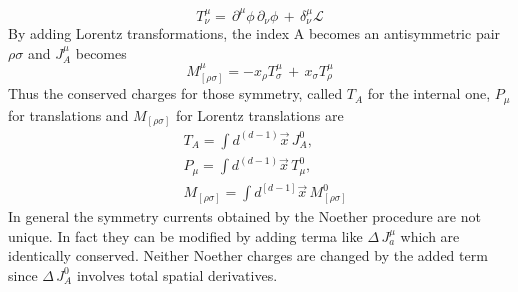 \documentclass[a4paper,10pt]{article}
\begin{document}
\begin{equation}
 T^\mu_\nu=\, \partial^\mu\phi\,\partial_\nu\phi\,+\,\delta^\mu_\nu\mathcal{L}
\end{equation}
By adding Lorentz transformations, the index A becomes an antisymmetric pair $\rho\sigma$
and $J^\mu_A$ becomes
\begin{equation}
 M^\mu_{[\rho \sigma]}=-x_\rho T^\mu_\sigma \, + \, x_\sigma T^\mu_\rho
\end{equation}
Thus the conserved charges for those symmetry, called $T_A$ for the internal one, $P_\mu$ for translations and $M_{[\rho \sigma]}$ for Lorentz translations are
\begin{equation}
 \begin{split}
  &T_A=\int{d^{(d-1)}\overrightarrow{x}\,J^0_A},\\
  &P_\mu=\int{d^{(d-1)}\overrightarrow{x}\,T^0_\mu},\\
  &M_{[\rho \sigma]}=\int{d^{[d-1]}\overrightarrow{x}\,M^0_{[\rho \sigma]}}
 \end{split}
\end{equation}
In general the symmetry currents obtained by the Noether procedure are not unique.
In fact they can be modified by adding terma like $\Delta\,J^\mu_a$ which are identically conserved.
Neither Noether charges are changed by the added term since $\Delta\,J^0_A$ involves total spatial derivatives.
\end{document}
